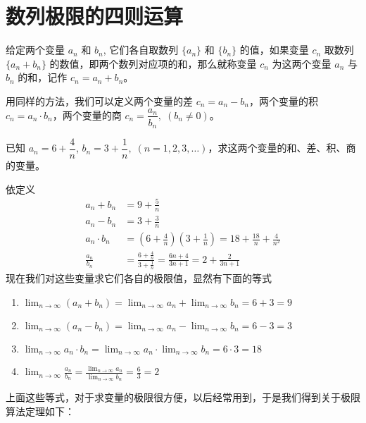 \section{数列极限的四则运算}
\begin{Definition}
给定两个变量 $a_n$ 和 $b_n$, 它们各自取数列 $\{a_n\}$ 和 $\{b_n\}$ 的值，如果变量 $c_n$ 取数列 $\{a_n+b_n\}$ 的数值，即两个数列对应项的和，那么就称变量 $c_n$ 为这两个变量 $a_n$ 与 $b_n$ 的和，记作 $c_n=a_n+b_n$。   
\end{Definition}
 
用同样的方法，我们可以定义两个变量的差 $c_n=a_n-b_n$，两个变量的积 $c_n=a_n\cdot b_n$，两个变量的商 $c_n=\dfrac{a_n}{b_n},\; (b_n\ne 0)$。

\begin{example}
  已知 $a_n=6+\dfrac{4}{n}$, $b_n=3+\dfrac{1}{n},\; (n=1,2,3,\ldots)$，求这两个变量的和、差、积、商的变量。
\end{example}

\begin{solution}
  依定义
\[\begin{split}
    a_n+b_n&=9+\frac{5}{n}\\
a_n-b_n&=3+\frac{3}{n}\\
a_n\cdot b_n&=\left(6+\frac{4}{n}\right)\left(3+\frac{1}{n}\right)=18+\frac{18}{n}+\frac{4}{n^2}\\
\frac{a_n}{b_n}&=\frac{6+\frac{4}{n}}{3+\frac{1}{n}}=\frac{6n+4}{3n+1}=2+\frac{2}{3n+1}
\end{split}\]
现在我们对这些变量求它们各自的极限值，显然有下面的等式
\begin{enumerate}[itemsep=10pt]
    \item $\displaystyle \lim_{n\to\infty}(a_n+b_n)=\lim_{n\to\infty}a_n+\lim_{n\to\infty}b_n=6+3=9$
    \item $\displaystyle \lim_{n\to\infty}(a_n-b_n)=\lim_{n\to\infty}a_n-\lim_{n\to\infty}b_n=6-3=3$
    \item $\displaystyle \lim_{n\to\infty}a_n\cdot b_n=\lim_{n\to\infty}a_n\cdot \lim_{n\to\infty}b_n=6\cdot 3=18$
    \item $\displaystyle \lim_{n\to\infty}\frac{a_n}{b_n}=\frac{\lim_{n\to\infty}a_n}{\lim_{n\to\infty}b_n}=\frac{6}{3}=2$
\end{enumerate}
\end{solution}

\bigskip
上面这些等式，对于求变量的极限很方便，以后经常用到，于是我们得到关于极限算法定理如下：

